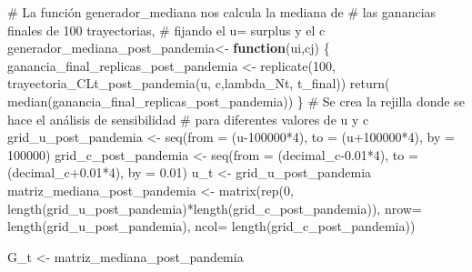\documentclass[
  us-letterpaper,
]{scrreprt}
\newenvironment{Shaded}{\begin{snugshade}}{\end{snugshade}}
\newcommand{\AttributeTok}[1]{\textcolor[rgb]{0.40,0.45,0.13}{#1}}
\newcommand{\CommentTok}[1]{\textcolor[rgb]{0.37,0.37,0.37}{#1}}
\newcommand{\ControlFlowTok}[1]{\textcolor[rgb]{0.00,0.23,0.31}{\textbf{#1}}}
\newcommand{\DecValTok}[1]{\textcolor[rgb]{0.68,0.00,0.00}{#1}}
\newcommand{\FloatTok}[1]{\textcolor[rgb]{0.68,0.00,0.00}{#1}}
\newcommand{\FunctionTok}[1]{\textcolor[rgb]{0.28,0.35,0.67}{#1}}
\newcommand{\NormalTok}[1]{\textcolor[rgb]{0.00,0.23,0.31}{#1}}
\newcommand{\OtherTok}[1]{\textcolor[rgb]{0.00,0.23,0.31}{#1}}
\newcommand{\SpecialCharTok}[1]{\textcolor[rgb]{0.37,0.37,0.37}{#1}}
\theoremstyle{plain}
\theoremstyle{plain}
\theoremstyle{definition}
\theoremstyle{remark}
\begin{document}
\begin{Shaded}
\begin{Highlighting}[]
\CommentTok{\# La función generador\_mediana nos calcula la mediana de }
\CommentTok{\# las ganancias finales de 100 trayectorias, }
\CommentTok{\# fijando el u= surplus y el c}
\NormalTok{generador\_mediana\_post\_pandemia}\OtherTok{\textless{}{-}} \ControlFlowTok{function}\NormalTok{(ui,cj)}
\NormalTok{  \{}
\NormalTok{  ganancia\_final\_replicas\_post\_pandemia }\OtherTok{\textless{}{-}} \FunctionTok{replicate}\NormalTok{(}\DecValTok{100}\NormalTok{,}
           \FunctionTok{trayectoria\_CLt\_post\_pandemia}\NormalTok{(u, c,lambda\_Nt, t\_final))}
    \FunctionTok{return}\NormalTok{( }\FunctionTok{median}\NormalTok{(ganancia\_final\_replicas\_post\_pandemia))}
\NormalTok{  \}}
\CommentTok{\# Se crea la rejilla donde se hace el análisis de sensibilidad}
\CommentTok{\# para diferentes valores de u y c}
\NormalTok{grid\_u\_post\_pandemia }\OtherTok{\textless{}{-}} \FunctionTok{seq}\NormalTok{(}\AttributeTok{from =}\NormalTok{ (u}\DecValTok{{-}100000}\SpecialCharTok{*}\DecValTok{4}\NormalTok{), }
                            \AttributeTok{to =}\NormalTok{ (u}\SpecialCharTok{+}\DecValTok{100000}\SpecialCharTok{*}\DecValTok{4}\NormalTok{), }
                            \AttributeTok{by =} \DecValTok{100000}\NormalTok{)}
\NormalTok{grid\_c\_post\_pandemia }\OtherTok{\textless{}{-}} \FunctionTok{seq}\NormalTok{(}\AttributeTok{from =}\NormalTok{ (decimal\_c}\FloatTok{{-}0.01}\SpecialCharTok{*}\DecValTok{4}\NormalTok{), }
                            \AttributeTok{to =}\NormalTok{ (decimal\_c}\FloatTok{+0.01}\SpecialCharTok{*}\DecValTok{4}\NormalTok{), }
                            \AttributeTok{by =} \FloatTok{0.01}\NormalTok{)}
\NormalTok{u\_t }\OtherTok{\textless{}{-}}\NormalTok{ grid\_u\_post\_pandemia}
\NormalTok{matriz\_mediana\_post\_pandemia }\OtherTok{\textless{}{-}} \FunctionTok{matrix}\NormalTok{(}\FunctionTok{rep}\NormalTok{(}\DecValTok{0}\NormalTok{, }
      \FunctionTok{length}\NormalTok{(grid\_u\_post\_pandemia)}\SpecialCharTok{*}\FunctionTok{length}\NormalTok{(grid\_c\_post\_pandemia)),}
      \AttributeTok{nrow=} \FunctionTok{length}\NormalTok{(grid\_u\_post\_pandemia), }
      \AttributeTok{ncol=} \FunctionTok{length}\NormalTok{(grid\_c\_post\_pandemia))}

\NormalTok{G\_t }\OtherTok{\textless{}{-}}\NormalTok{ matriz\_mediana\_post\_pandemia}


\end{Highlighting}
\end{Shaded}
\end{document}
